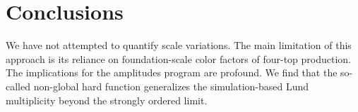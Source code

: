 \section{Conclusions}\label{sec:conclusions}

We have not attempted to quantify scale variations. The main limitation
of this approach is its reliance on foundation-scale color factors of
four-top production. The implications for the amplitudes program are
profound. We find that the so-called non-global hard function
generalizes the simulation-based Lund multiplicity beyond the strongly
ordered limit.

